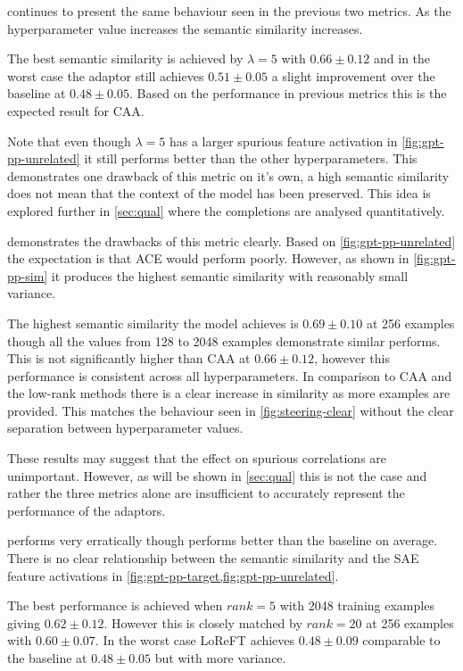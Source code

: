  continues to present the same behaviour seen in the previous two metrics.
As the hyperparameter value increases the semantic similarity increases.

The best semantic similarity is achieved by $\lambda = 5$ with $0.66 \pm 0.12$ and in the worst case the adaptor still achieves $0.51 \pm 0.05$ a slight improvement over the baseline at $0.48 \pm 0.05$.
Based on the performance in previous metrics this is the expected result for CAA.

Note that even though $\lambda = 5$ has a larger spurious feature activation in \cref{fig:gpt-pp-unrelated} it still performs better than the other hyperparameters.
This demonstrates one drawback of this metric on it's own, a high semantic similarity does not mean that the context of the model has been preserved.
This idea is explored further in \cref{sec:qual} where the completions are analysed quantitatively.

 demonstrates the drawbacks of this metric clearly.
Based on \cref{fig:gpt-pp-unrelated} the expectation is that ACE would perform poorly.
However, as shown in \cref{fig:gpt-pp-sim} it produces the highest semantic similarity with reasonably small variance.

The highest semantic similarity the model achieves is $0.69 \pm 0.10$ at 256 examples though all the values from 128 to 2048 examples demonstrate similar performs.
This is not significantly higher than CAA at $0.66 \pm 0.12$, however this performance is consistent across all hyperparameters.
In comparison to CAA and the low-rank methods there is a clear increase in similarity as more examples are provided.
This matches the behaviour seen in \cref{fig:steering-clear} without the clear separation between hyperparameter values.

These results may suggest that the effect on spurious correlations are unimportant.
However, as will be shown in \cref{sec:qual} this is not the case and rather the three metrics alone are insufficient to accurately represent the performance of the adaptors.

 performs very erratically though performs better than the baseline on average.
There is no clear relationship between the semantic similarity and the SAE feature activations in \cref{fig:gpt-pp-target,fig:gpt-pp-unrelated}.

The best performance is achieved when $rank = 5$ with 2048 training examples giving $0.62 \pm 0.12$.
However this is closely matched by $rank = 20$ at 256 examples with $0.60 \pm 0.07$.
In the worst case LoReFT achieves $0.48 \pm 0.09$ comparable to the baseline at $0.48 \pm 0.05$ but with more variance.

